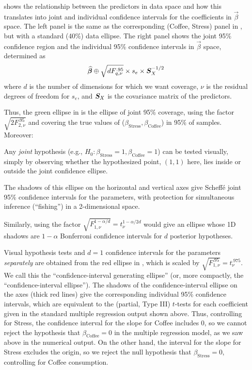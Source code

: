 shows the relationship between the
predictors in data space and how this translates into joint and
individual confidence intervals for the coefficients in
$\vec{\beta}$ space.  The left panel is the same as the corresponding
(Coffee, Stress) panel in , but with
a standard (40\%) data ellipse. The right panel shows the joint 95\% confidence
region and the individual 95\% confidence intervals in $\vec{\beta}$ space, determined as
\begin{equation*}
 \widehat{\bm{\beta}} \oplus \sqrt{d F^{.95}_{q, \nu}} \times s_e \times \bm{S}_X^{-1/2}
\end{equation*}
where $d$ is the number of dimensions for which we want coverage,
$\nu$ is the residual degrees of freedom for $s_e$, and $\bm{S}_X$
is the covariance matrix of the predictors.

Thus, the green ellipse in  is the
ellipse of joint 95\% coverage, using the factor $\sqrt{2 F^{.95}_{2, \nu}}$
and covering the true values of ($\beta_{\mathrm{Stress}}, \beta_{\mathrm{Coffee}}$)
in 95\% of samples.  Moreover:
\begin{itemize*}
  \item Any \emph{joint} hypothesis (e.g., $H_0:\beta_{\mathrm{Stress}}=1, \beta_{\mathrm{Coffee}}=1$)
can be tested visually, simply by observing whether the
hypothesized point, $(1, 1)$ here, lies inside or outside the joint confidence ellipse.
  \item The shadows of this ellipse on the horizontal and vertical axes
give Scheff\'e joint 95\%  confidence intervals for the parameters, with protection for 
simultaneous inference (``fishing'')
in a 2-dimensional space.
  \item Similarly, using the factor
$\sqrt{F^{1-\alpha/d}_{1, \nu}} = t^{1-\alpha/2d}_\nu$ would give an
ellipse whose 1D shadows are $1-\alpha$ Bonferroni confidence intervals
for $d$ posterior hypotheses.
\end{itemize*}

Visual hypothesis tests and $d=1$ confidence intervals for the parameters \emph{separately}
are obtained from the red ellipse in ,
which is scaled by $\sqrt{F^{.95}_{1, \nu}} = t^{.975}_\nu$. We call this the ``confidence-interval generating ellipse'' (or, more compactly, the ``confidence-interval ellipse'').
The shadows of the confidence-interval ellipse on the axes (thick red lines) give the
corresponding individual 95\% confidence intervals, which are
equivalent to the (partial, Type III) $t$-tests for each coefficient given in the
standard multiple regression output shown above.
Thus, controlling for Stress, the confidence interval for the slope for Coffee includes 0,
so we cannot reject the hypothesis that $\beta_{\mathrm{Coffee}}=0$
in the multiple regression model, as we saw above in the numerical output.
On the other hand, the interval for the slope for Stress excludes the origin,
so we reject the null hypothesis that $\beta_{\mathrm{Stress}}=0$,
controlling for Coffee consumption.

